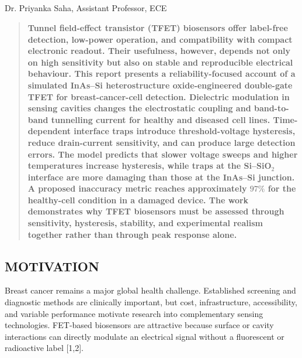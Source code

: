 \begin{center}
  \section{}
  Dr. Priyanka Saha, Assistant Professor, ECE
\end{center}

\setcounter{figure}{0}
\setcounter{table}{0}

\begin{multicols}{2}
  \begin{abstract}
    \bfseries
    Tunnel field-effect transistor (TFET) biosensors offer label-free detection, low-power operation, and compatibility with compact electronic readout. Their usefulness, however, depends not only on high sensitivity but also on stable and reproducible electrical behaviour. This report presents a reliability-focused account of a simulated InAs--Si heterostructure oxide-engineered double-gate TFET for breast-cancer-cell detection. Dielectric modulation in sensing cavities changes the electrostatic coupling and band-to-band tunnelling current for healthy and diseased cell lines. Time-dependent interface traps introduce threshold-voltage hysteresis, reduce drain-current sensitivity, and can produce large detection errors. The model predicts that slower voltage sweeps and higher temperatures increase hysteresis, while traps at the Si--SiO$_2$ interface are more damaging than those at the InAs--Si junction. A proposed inaccuracy metric reaches approximately $97\%$ for the healthy-cell condition in a damaged device. The work demonstrates why TFET biosensors must be assessed through sensitivity, hysteresis, stability, and experimental realism together rather than through peak response alone.
  \end{abstract}

  \subsection*{\centering\uppercase{Motivation}}
  Breast cancer remains a major global health challenge. Established screening and diagnostic methods are clinically important, but cost, infrastructure, accessibility, and variable performance motivate research into complementary sensing technologies. FET-based biosensors are attractive because surface or cavity interactions can directly modulate an electrical signal without a fluorescent or radioactive label [1,2].


\end{multicols}
